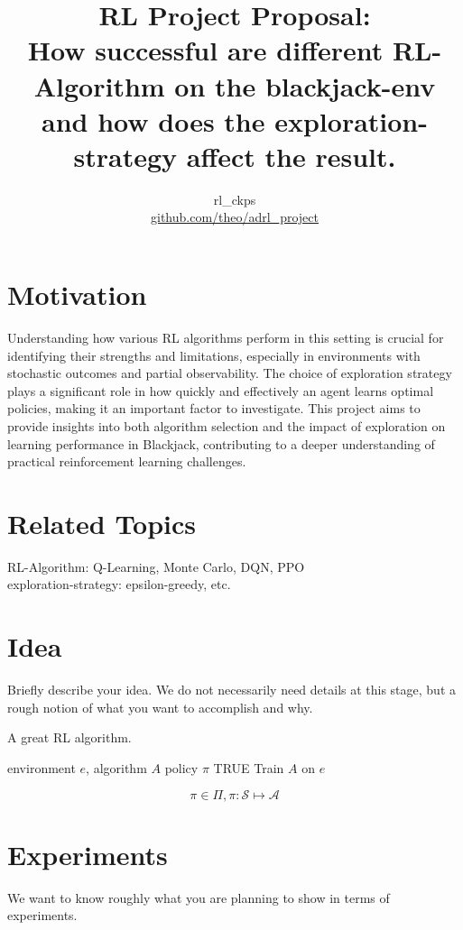 \documentclass{article}
\title{{\large RL Project Proposal:}\\

How successful are different RL-Algorithm on the blackjack-env and how does the exploration-strategy affect the result.}
\author{rl\_ckps \\ \url{github.com/theo/adrl_project}}
\begin{document}
\maketitle
\section{Motivation}
Understanding how various RL algorithms perform in this setting is crucial for identifying their strengths and limitations, especially in environments with stochastic outcomes and partial observability. The choice of exploration strategy plays a significant role in how quickly and effectively an agent learns optimal policies, making it an important factor to investigate. This project aims to provide insights into both algorithm selection and the impact of exploration on learning performance in Blackjack, contributing to a deeper understanding of practical reinforcement learning challenges.

\section{Related Topics}
RL-Algorithm: Q-Learning, Monte Carlo, DQN, PPO\\
exploration-strategy: epsilon-greedy, etc.

\section{Idea}
Briefly describe your idea. We do not necessarily need details at this stage, but a rough notion of what you want to accomplish and why.

\begin{algorithm}[H]
    \caption{A great RL algorithm.}
    \label{alg:code}
    \begin{algorithmic}
        \Require environment $e$, algorithm $A$
        \Return policy $\pi$
        \While TRUE
            \State Train $A$ on $e$
        \EndWhile
    \end{algorithmic}
\end{algorithm}

\begin{equation}
    \label{eq:pi}
    \pi \in \Pi, \pi: \mathcal{S} \mapsto \mathcal{A}
\end{equation}

\section{Experiments}
We want to know roughly what you are planning to show in terms of experiments. 
\end{document}
